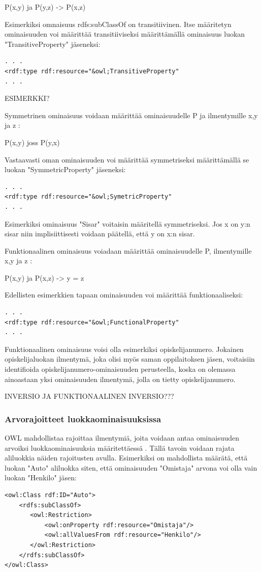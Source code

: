 \documentclass[finnish]{tktltiki2}
\theoremstyle{definition}
\theoremstyle{remark}
\begin{document}
P(x,y) ja P(y,z) -> P(x,z)

Esimerkiksi omnaisuus rdfs:subClassOf on transitiivinen. Itse määritetyn ominaisuuden voi määrittää transitiiviseksi määrittämällä ominaisuus luokan "TransitiveProperty" jäseneksi:
\begin{verbatim}
. . .
<rdf:type rdf:resource="&owl;TransitiveProperty"
. . .
\end{verbatim}
ESIMERKKI?

Symmetrinen ominaisuus voidaan määrittää ominaisuudelle P ja ilmentymille x,y ja z  \cite{SWM04}:

P(x,y) joss P(y,x)

Vastaavasti oman ominaisuuden voi määrittää symmetriseksi määrittämällä se luokan "SymmetricProperty" jäseneksi:
\begin{verbatim}
. . .
<rdf:type rdf:resource="&owl;SymetricProperty"
. . .
\end{verbatim}
Esimerkiksi ominaisuus "Sisar" voitaisin määritellä symmetriseksi. Jos x on y:n sisar niin implisiittisesti voidaan päätellä, että y on x:n sisar.

Funktionaalinen ominaisuus voiadaan määrittää ominaisuudelle P, ilmentymille x,y ja z  \cite{SWM04}:

P(x,y) ja P(x,z) -> y = z

Edellisten esimerkkien tapaan ominaisuuden voi määrittää funktionaaliseksi:
\begin{verbatim}
. . .
<rdf:type rdf:resource="&owl;FunctionalProperty"
. . .
\end{verbatim}
Funktionaalinen ominaisuus voisi olla esimerkiksi opiskelijanumero. Jokainen opiskelijaluokan ilmentymä, joka olisi myös saman oppilaitoksen jäsen, voitaisiin identifioida opiskelijanumero-ominaisuuden perusteella, koska on olemassa ainoastaan yksi ominaisuuden ilmentymä, jolla on tietty opiskelijanumero.

INVERSIO JA FUNKTIONAALINEN INVERSIO???

\subsubsection{Arvorajoitteet luokkaominaisuuksissa}
OWL mahdollistaa rajoittaa ilmentymiä, joita voidaan antaa ominaisuuden arvoiksi luokkaominaisuuksia määritettäessä \cite{SWM04}. Tällä tavoin voidaan rajata aliluokkia näiden rajoitusten avulla.  Esimerkiksi on mahdollista määrätä, että luokan "Auto" aliluokka siten, että ominaisuuden "Omistaja" arvona voi olla vain luokan "Henkilo" jäsen:
\begin{verbatim}
<owl:Class rdf:ID="Auto">
    <rdfs:subClassOf>
       <owl:Restriction>
           <owl:onProperty rdf:resource="Omistaja"/>
           <owl:allValuesFrom rdf:resource="Henkilo"/>
       </owl:Restriction>        
    </rdfs:subClassOf>
</owl:Class>    
\end{verbatim}
\end{document}

